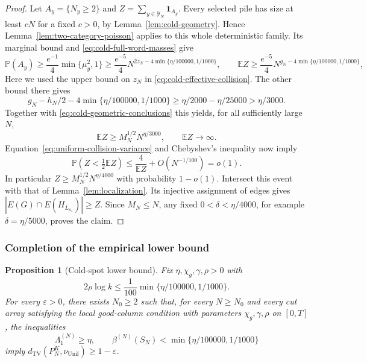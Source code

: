 \documentclass[11pt]{article}
\numberwithin{equation}{section}
\newtheorem{proposition}[theorem]{Proposition}
\theoremstyle{definition}
\theoremstyle{remark}
\newcommand{\E}{\mathbb E}
\newcommand{\Pp}{\mathbb P}
\newcommand{\TV}{\mathrm{TV}}
\newcommand{\Unif}{\mathrm{Unif}}
\newcommand{\dTV}{d_{\TV}}
\newcommand{\nuUnif}{\nu_{\Unif}}
\newcommand{\1}{\mathbf 1}
\begin{document}
\begin{proof}
Let $A_y=\{N_y\ge2\}$ and $Z=\sum_{y\in\mathcal Y_N}\mathbf 1_{A_y}$.
Every selected pile has size at least $cN$ for a fixed $c>0$, by
Lemma~\ref{lem:cold-geometry}. Hence
Lemma~\ref{lem:two-category-poisson} applies to this whole deterministic
family. Its marginal bound and \eqref{eq:cold-full-word-masses} give
\[
 \Pp(A_y)\ge \frac{e^{-1}}4\min\{\mu_y^2,1\}
 \ge \frac{e^{-5}}4N^{2z_N-4\min\{\eta/100000,1/1000\}},\qquad
 \E Z\ge \frac{e^{-5}}4N^{g_N-4\min\{\eta/100000,1/1000\}},
\]
Here we used the upper bound on $z_N$ in \eqref{eq:cold-effective-collision}.
The other bound there gives
\[
 g_N-h_N/2-4\min\{\eta/100000,1/1000\}
 \ge\eta/2000-\eta/25000>\eta/3000.
\]
Together with \eqref{eq:cold-geometric-conclusions} this yields, for all
sufficiently large $N$,
\[
 \E Z\ge M_N^{1/2}N^{\eta/3000},\qquad \E Z\longrightarrow\infty.
\]
Equation~\eqref{eq:uniform-collision-variance} and Chebyshev's inequality
now imply
\[
 \Pp(Z<\tfrac12\E Z)
 \le\frac4{\E Z}+O(N^{-1/100})=o(1).
\]
In particular $Z\ge M_N^{1/2}N^{\eta/4000}$ with probability $1-o(1)$.
Intersect this event with that of Lemma~\ref{lem:localization}. Its
injective assignment of edges gives
$|E(G)\cap E(H_{L_{a_s}})|\ge Z$. Since $M_N\le N$, any fixed
$0<\delta<\eta/4000$, for example $\delta=\eta/5000$, proves the claim.
\end{proof}






\subsubsection{Completion of the empirical lower bound}

\begin{proposition}[Cold-spot lower bound]%
\label{prop:cold-lower}
Fix $\eta,\chi_g,\gamma,\rho>0$ with
\[
 2\rho\log k\le\frac1{100}\min\{\eta/100000,1/1000\}.
\]
For every $\varepsilon>0$, there exists $N_0\ge2$ such that, for every
$N\ge N_0$ and every cut array satisfying the local good-column condition
with parameters $\chi_g,\gamma,\rho$ on $[0,T]$, the inequalities
\[
 \Lambda_1^{(N)}\ge\eta,\qquad
 \beta^{(N)}(S_N)<\min\{\eta/100000,1/1000\}
\]
imply $\dTV(P_N^K,\nuUnif)\ge1-\varepsilon$.
\end{proposition}
\end{document}
